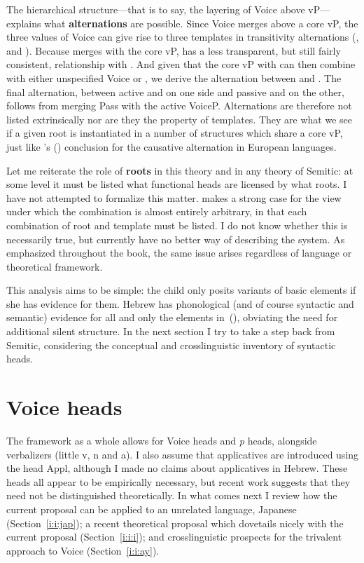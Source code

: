 The hierarchical structure---that is to say, the layering of Voice above vP---explains what \textbf{alternations} are possible. Since Voice merges above a core vP, the three values of Voice can give rise to three templates in transitivity alternations ({\tkal}, {\tnif} and {\thif}). Because {\va} merges with the core vP, {\tpie} has a less transparent, but still fairly consistent, relationship with {\tkal}. And given that the core vP with {\va} can then combine with either unspecified Voice or {\vz}, we derive the alternation between {\tpie} and {\thit}. The final alternation, between active {\tpie} and {\thif} on one side and passive {\tpua} and {\thuf} on the other, follows from merging Pass with the active VoiceP. Alternations are therefore not listed extrinsically nor are they the property of templates. They are what we see if a given root is instantiated in a number of structures which share a core vP, just like \citeauthor{schaefer08}'s (\citeyear{schaefer08}) conclusion for the causative alternation in European languages.

Let me reiterate the role of \textbf{roots} in this theory and in any theory of Semitic: at some level it must be listed what functional heads are licensed by what roots. I have not attempted to formalize this matter. \cite{arad05} makes a strong case for the view under which the combination is almost entirely arbitrary, in that each combination of root and template must be listed. I do not know whether this is necessarily true, but currently have no better way of describing the system. As emphasized throughout the book, the same issue arises regardless of language or theoretical framework.

This analysis aims to be simple: the child only posits variants of basic elements if she has evidence for them. Hebrew has phonological (and of course syntactic and semantic) evidence for all and only the elements in~(\lastx), obviating the need for additional silent structure. In the next section I try to take a step back from Semitic, considering the conceptual and crosslinguistic inventory of syntactic heads.


\section{Voice heads} \label{i:i}
The framework as a whole allows for Voice heads and \emph{p} heads, alongside verbalizers (little v, n and a). I also assume that applicatives are introduced using the head Appl, although I made no claims about applicatives in Hebrew. These heads all appear to be empirically necessary, but recent work suggests that they need not be distinguished theoretically. In what comes next I review how the current proposal can be applied to an unrelated language, Japanese (Section~\ref{i:i:jap}); a recent theoretical proposal which dovetails nicely with the current proposal (Section~\ref{i:i:i}); and crosslinguistic prospects for the trivalent approach to Voice (Section~\ref{i:i:ay}).


